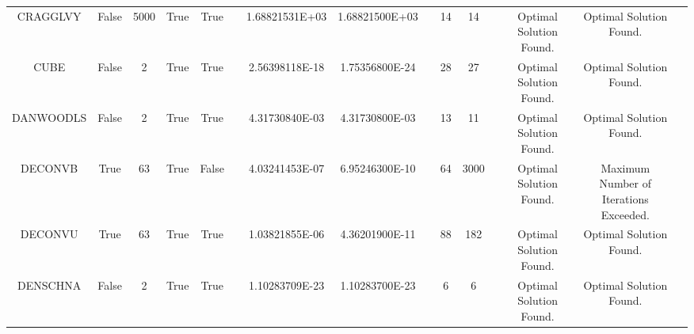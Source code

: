 \begin{longtable}{ccccccccccccccc}
	\cellcolor{default2} CRAGGLVY& \cellcolor{default2} False& \cellcolor{default2} 5000& \cellcolor{default2} True& \cellcolor{default2} True& \cellcolor{header} & \cellcolor{ok} 1.68821531E+03& \cellcolor{best} 1.68821500E+03& \cellcolor{header} & \cellcolor{best} 14& \cellcolor{best} 14& \cellcolor{header} & \cellcolor{default2} Optimal Solution Found.& \cellcolor{default2} Optimal Solution Found.& \cellcolor{header} \\
	\cellcolor{default1} CUBE& \cellcolor{default1} False& \cellcolor{default1} 2& \cellcolor{default1} True& \cellcolor{default1} True& \cellcolor{header} & \cellcolor{ok} 2.56398118E-18& \cellcolor{best} 1.75356800E-24& \cellcolor{header} & \cellcolor{ok} 28& \cellcolor{best} 27& \cellcolor{header} & \cellcolor{default1} Optimal Solution Found.& \cellcolor{default1} Optimal Solution Found.& \cellcolor{header} \\
	\cellcolor{default2} DANWOODLS& \cellcolor{default2} False& \cellcolor{default2} 2& \cellcolor{default2} True& \cellcolor{default2} True& \cellcolor{header} & \cellcolor{ok} 4.31730840E-03& \cellcolor{best} 4.31730800E-03& \cellcolor{header} & \cellcolor{ok} 13& \cellcolor{best} 11& \cellcolor{header} & \cellcolor{default2} Optimal Solution Found.& \cellcolor{default2} Optimal Solution Found.& \cellcolor{header} \\
	\cellcolor{default1} DECONVB& \cellcolor{default1} True& \cellcolor{default1} 63& \cellcolor{default1} True& \cellcolor{default1} False& \cellcolor{header} & \cellcolor{ok} 4.03241453E-07& \cellcolor{best} 6.95246300E-10& \cellcolor{header} & \cellcolor{best} 64& \cellcolor{poor} 3000& \cellcolor{header} & \cellcolor{default1} Optimal Solution Found.& \cellcolor{default1} Maximum Number of Iterations Exceeded.& \cellcolor{header} \\
	\cellcolor{default2} DECONVU& \cellcolor{default2} True& \cellcolor{default2} 63& \cellcolor{default2} True& \cellcolor{default2} True& \cellcolor{header} & \cellcolor{ok} 1.03821855E-06& \cellcolor{best} 4.36201900E-11& \cellcolor{header} & \cellcolor{best} 88& \cellcolor{poor} 182& \cellcolor{header} & \cellcolor{default2} Optimal Solution Found.& \cellcolor{default2} Optimal Solution Found.& \cellcolor{header} \\
	\cellcolor{default1} DENSCHNA& \cellcolor{default1} False& \cellcolor{default1} 2& \cellcolor{default1} True& \cellcolor{default1} True& \cellcolor{header} & \cellcolor{ok} 1.10283709E-23& \cellcolor{best} 1.10283700E-23& \cellcolor{header} & \cellcolor{best} 6& \cellcolor{best} 6& \cellcolor{header} & \cellcolor{default1} Optimal Solution Found.& \cellcolor{default1} Optimal Solution Found.& \cellcolor{header} \\

\end{longtable}

